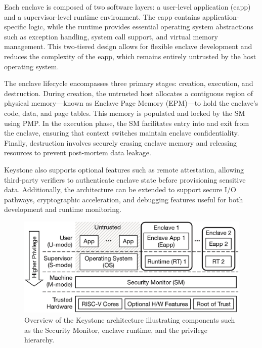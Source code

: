 Each enclave is composed of two software layers: a user-level application (eapp) and a supervisor-level runtime environment. The eapp contains application-specific logic, while the runtime provides essential operating system abstractions such as exception handling, system call support, and virtual memory management. This two-tiered design allows for flexible enclave development and reduces the complexity of the eapp, which remains entirely untrusted by the host operating system.

The enclave lifecycle encompasses three primary stages: creation, execution, and destruction. During creation, the untrusted host allocates a contiguous region of physical memory—known as Enclave Page Memory (EPM)—to hold the enclave’s code, data, and page tables. This memory is populated and locked by the SM using PMP. In the execution phase, the SM facilitates entry into and exit from the enclave, ensuring that context switches maintain enclave confidentiality. Finally, destruction involves securely erasing enclave memory and releasing resources to prevent post-mortem data leakage.

Keystone also supports optional features such as remote attestation, allowing third-party verifiers to authenticate enclave state before provisioning sensitive data. Additionally, the architecture can be extended to support secure I/O pathways, cryptographic acceleration, and debugging features useful for both development and runtime monitoring.

\begin{figure}[htbp]
\centering
\includegraphics[width=0.9\linewidth]{figures/keystone_overview.png}
\caption{Overview of the Keystone architecture illustrating components such as the Security Monitor, enclave runtime, and the privilege hierarchy.}
\label{fig:keystone_overview}
\end{figure}

